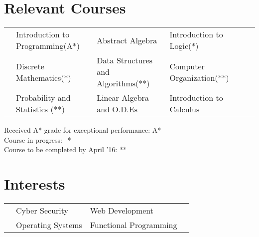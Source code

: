 \documentclass[11pt,a4paper]{article}
\begin{document}
\vspace{-0.4cm}
\section*{Relevant Courses}
\vspace{-0.2cm}
\begin{tabular}{L{0.05cm} L{5.8cm} L{6.5cm} L{7.5cm} L{8cm} L{13cm}}
& Introduction to Programming(A*)  & Abstract Algebra & Introduction to Logic(*)\\
& Discrete Mathematics(*)          & Data Structures and Algorithms(**) & Computer Organization(**)\\
& Probability and Statistics (**)   & Linear Algebra and O.D.Es          & Introduction to Calculus
\end{tabular}

\vspace{-0.2cm}
\begin{flushright}
  \footnotesize{Received A* grade for exceptional performance: A*}\\
  \footnotesize{Course in progress:$\ \ $ *}\\
  \footnotesize{Course to be completed by April '16: **}
\end{flushright}

\vspace{-1.5cm}
\section*{Interests}
\vspace{-0.3cm}
\begin{tabular}{L{0.05cm} L{7cm} L{6.5cm} L{7.5cm}}
& Cyber Security    & Web Development\\
& Operating Systems & Functional Programming
\end{tabular}
\end{document}

